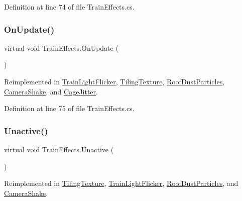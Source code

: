 Definition at line 74 of file Train\+Effects.\+cs.

\mbox{\label{class_train_effects_a245e2891464a93bda2d8f80c1fb53e2c}} 
\subsubsection{\texorpdfstring{On\+Update()}{OnUpdate()}}
{\footnotesize\ttfamily virtual void Train\+Effects.\+On\+Update (\begin{DoxyParamCaption}{ }\end{DoxyParamCaption})\hspace{0.3cm}{\ttfamily [virtual]}}



Reimplemented in \mbox{\hyperlink{class_train_light_flicker_ad39662ddbaa2a6b30a2c1711cda88c54}{Train\+Light\+Flicker}}, \mbox{\hyperlink{class_tiling_texture_af38d77dd9f6f05e650c74f246a22556d}{Tiling\+Texture}}, \mbox{\hyperlink{class_roof_dust_particles_afbc9f6eba4034be6c2f9899b68dca63c}{Roof\+Dust\+Particles}}, \mbox{\hyperlink{class_camera_shake_a4bc10cdc460936d634078c39db1aed3b}{Camera\+Shake}}, and \mbox{\hyperlink{class_cage_jitter_a0e84c06f7b50189264d001f5317fc50e}{Cage\+Jitter}}.



Definition at line 75 of file Train\+Effects.\+cs.

\mbox{\label{class_train_effects_a126011673013f79d482f135be84afc96}} 
\subsubsection{\texorpdfstring{Unactive()}{Unactive()}}
{\footnotesize\ttfamily virtual void Train\+Effects.\+Unactive (\begin{DoxyParamCaption}{ }\end{DoxyParamCaption})\hspace{0.3cm}{\ttfamily [virtual]}}



Reimplemented in \mbox{\hyperlink{class_tiling_texture_adf5b4300ae77f9a1602318da7a0ccc96}{Tiling\+Texture}}, \mbox{\hyperlink{class_train_light_flicker_a82942fb531694697ed18e20a15740d01}{Train\+Light\+Flicker}}, \mbox{\hyperlink{class_roof_dust_particles_a3b1f935efa79fca67c5556425b0210ae}{Roof\+Dust\+Particles}}, and \mbox{\hyperlink{class_camera_shake_ac7c118994512130c10ff57af288fe43e}{Camera\+Shake}}.



